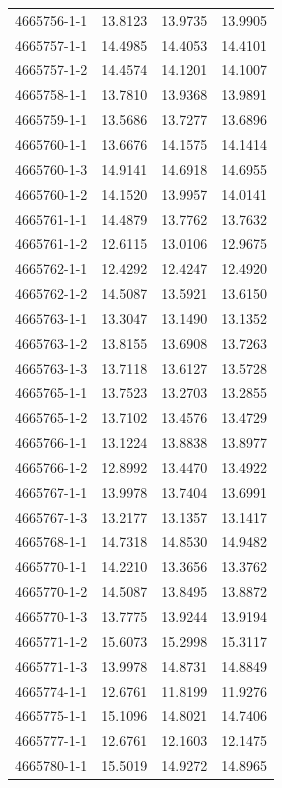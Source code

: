 \begin{longtable}{lrrr}
4665756-1-1 & 13.8123 & 13.9735 & 13.9905 \\
4665757-1-1 & 14.4985 & 14.4053 & 14.4101 \\
4665757-1-2 & 14.4574 & 14.1201 & 14.1007 \\
4665758-1-1 & 13.7810 & 13.9368 & 13.9891 \\
4665759-1-1 & 13.5686 & 13.7277 & 13.6896 \\
4665760-1-1 & 13.6676 & 14.1575 & 14.1414 \\
4665760-1-3 & 14.9141 & 14.6918 & 14.6955 \\
4665760-1-2 & 14.1520 & 13.9957 & 14.0141 \\
4665761-1-1 & 14.4879 & 13.7762 & 13.7632 \\
4665761-1-2 & 12.6115 & 13.0106 & 12.9675 \\
4665762-1-1 & 12.4292 & 12.4247 & 12.4920 \\
4665762-1-2 & 14.5087 & 13.5921 & 13.6150 \\
4665763-1-1 & 13.3047 & 13.1490 & 13.1352 \\
4665763-1-2 & 13.8155 & 13.6908 & 13.7263 \\
4665763-1-3 & 13.7118 & 13.6127 & 13.5728 \\
4665765-1-1 & 13.7523 & 13.2703 & 13.2855 \\
4665765-1-2 & 13.7102 & 13.4576 & 13.4729 \\
4665766-1-1 & 13.1224 & 13.8838 & 13.8977 \\
4665766-1-2 & 12.8992 & 13.4470 & 13.4922 \\
4665767-1-1 & 13.9978 & 13.7404 & 13.6991 \\
4665767-1-3 & 13.2177 & 13.1357 & 13.1417 \\
4665768-1-1 & 14.7318 & 14.8530 & 14.9482 \\
4665770-1-1 & 14.2210 & 13.3656 & 13.3762 \\
4665770-1-2 & 14.5087 & 13.8495 & 13.8872 \\
4665770-1-3 & 13.7775 & 13.9244 & 13.9194 \\
4665771-1-2 & 15.6073 & 15.2998 & 15.3117 \\
4665771-1-3 & 13.9978 & 14.8731 & 14.8849 \\
4665774-1-1 & 12.6761 & 11.8199 & 11.9276 \\
4665775-1-1 & 15.1096 & 14.8021 & 14.7406 \\
4665777-1-1 & 12.6761 & 12.1603 & 12.1475 \\
4665780-1-1 & 15.5019 & 14.9272 & 14.8965 \\

\end{longtable}
